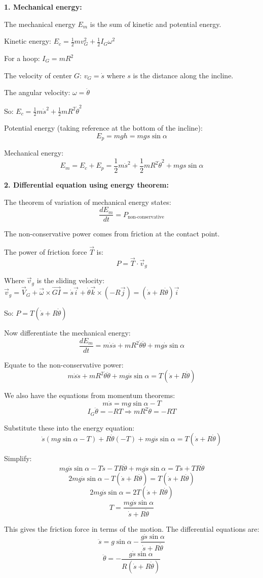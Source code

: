 \documentclass[12pt]{article}
\begin{document}
\begin{correctionbox}
\textbf{1. Mechanical energy:}

The mechanical energy $E_m$ is the sum of kinetic and potential energy.

Kinetic energy: $E_c = \frac{1}{2}mv_G^2 + \frac{1}{2}I_G\omega^2$

For a hoop: $I_G = mR^2$

The velocity of center $G$: $v_G = \dot{s}$ where $s$ is the distance along the incline.

The angular velocity: $\omega = \dot{\theta}$

So: $E_c = \frac{1}{2}m\dot{s}^2 + \frac{1}{2}mR^2\dot{\theta}^2$

Potential energy (taking reference at the bottom of the incline):
$$E_p = mgh = mgs\sin\alpha$$

Mechanical energy:
$$E_m = E_c + E_p = \frac{1}{2}m\dot{s}^2 + \frac{1}{2}mR^2\dot{\theta}^2 + mgs\sin\alpha$$

\textbf{2. Differential equation using energy theorem:}

The theorem of variation of mechanical energy states:
$$\frac{dE_m}{dt} = P_{\text{non-conservative}}$$

The non-conservative power comes from friction at the contact point.

The power of friction force $\vec{T}$ is:
$$P = \vec{T} \cdot \vec{v}_g$$

Where $\vec{v}_g$ is the sliding velocity: $\vec{v}_g = \vec{V}_G + \vec{\omega} \times \vec{GI} = \dot{s}\vec{i} + \dot{\theta}\vec{k} \times (-R\vec{j}) = (\dot{s} + R\dot{\theta})\vec{i}$

So: $P = T(\dot{s} + R\dot{\theta})$

Now differentiate the mechanical energy:
$$\frac{dE_m}{dt} = m\dot{s}\ddot{s} + mR^2\dot{\theta}\ddot{\theta} + mg\dot{s}\sin\alpha$$

Equate to the non-conservative power:
$$m\dot{s}\ddot{s} + mR^2\dot{\theta}\ddot{\theta} + mg\dot{s}\sin\alpha = T(\dot{s} + R\dot{\theta})$$

We also have the equations from momentum theorems:
$$m\ddot{s} = mg\sin\alpha - T$$
$$I_G\ddot{\theta} = -RT \Rightarrow mR^2\ddot{\theta} = -RT$$

Substitute these into the energy equation:
$$\dot{s}(mg\sin\alpha - T) + R\dot{\theta}(-T) + mg\dot{s}\sin\alpha = T(\dot{s} + R\dot{\theta})$$

Simplify:
$$mg\dot{s}\sin\alpha - T\dot{s} - TR\dot{\theta} + mg\dot{s}\sin\alpha = T\dot{s} + TR\dot{\theta}$$
$$2mg\dot{s}\sin\alpha - T(\dot{s} + R\dot{\theta}) = T(\dot{s} + R\dot{\theta})$$
$$2mg\dot{s}\sin\alpha = 2T(\dot{s} + R\dot{\theta})$$
$$T = \frac{mg\dot{s}\sin\alpha}{\dot{s} + R\dot{\theta}}$$

This gives the friction force in terms of the motion. The differential equations are:
$$\ddot{s} = g\sin\alpha - \frac{g\dot{s}\sin\alpha}{\dot{s} + R\dot{\theta}}$$
$$\ddot{\theta} = -\frac{g\dot{s}\sin\alpha}{R(\dot{s} + R\dot{\theta})}$$
\end{correctionbox}
\end{document}
